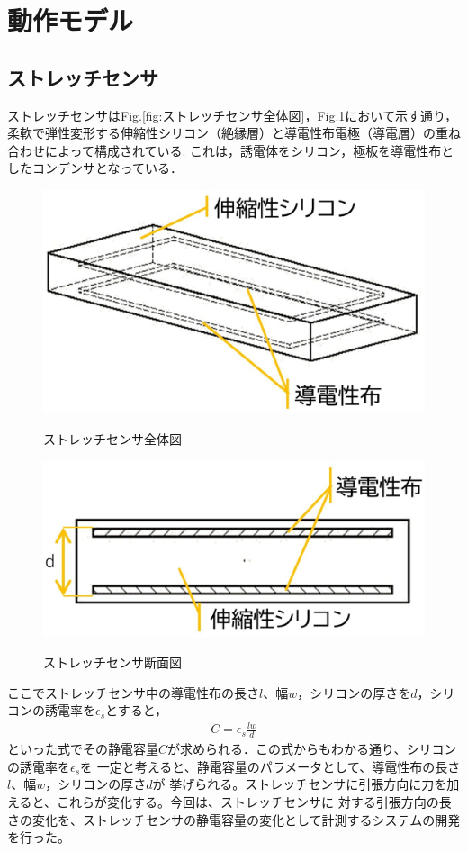 \section{動作モデル}
\subsection{ストレッチセンサ}
ストレッチセンサはFig.\ref{fig:ストレッチセンサ全体図}，Fig.\ref{fig:ストレッチセンサ断面図}において示す通り，
柔軟で弾性変形する伸縮性シリコン（絶縁層）と導電性布電極（導電層）の重ね合わせによって構成されている.
これは，誘電体をシリコン，極板を導電性布としたコンデンサとなっている．

\begin{figure}[h]
    \begin{center}
        \label{fig:ストレッチセンサ全体図}
        \includegraphics[width=0.4\columnwidth,clip]{./2_measurement/slide1.eps}
        \caption{ストレッチセンサ全体図}     
        \label{fig:ストレッチセンサ断面図}
        \includegraphics[width=0.4\columnwidth,clip]{./2_measurement/slide2.eps}
        \caption{ストレッチセンサ断面図}
    \end{center}
\end{figure}

ここでストレッチセンサ中の導電性布の長さ$l$、幅$w$，シリコンの厚さを$d$，シリコンの誘電率を$\epsilon{}_s$とすると，
\begin{eqnarray}
    C=\epsilon{}_s\frac{lw}{d}
    \label{eq:cap}
\end{eqnarray}
といった式でその静電容量$C$が求められる．この式からもわかる通り、シリコンの誘電率を$\epsilon{}_s$を
一定と考えると、静電容量のパラメータとして、導電性布の長さ$l$、幅$w$，シリコンの厚さ$d$が
挙げられる。ストレッチセンサに引張方向に力を加えると、これらが変化する。今回は、ストレッチセンサに
対する引張方向の長さの変化を、ストレッチセンサの静電容量の変化として計測するシステムの開発を行った。


